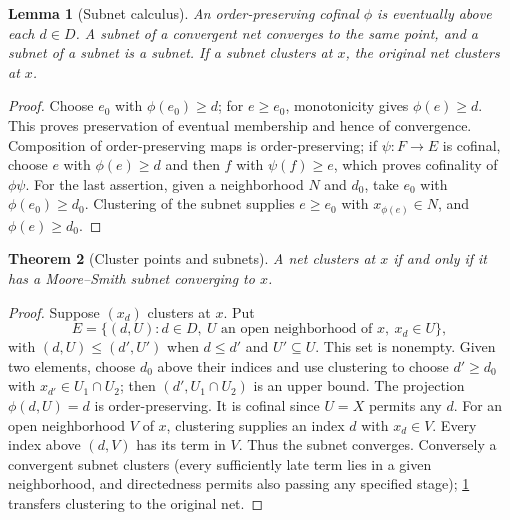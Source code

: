 \documentclass[11pt,oneside,openany]{book}
\newtheorem{theorem}{Theorem}[chapter]
\newtheorem{lemma}[theorem]{Lemma}
\theoremstyle{definition}
\theoremstyle{remark}
\begin{document}
\begin{lemma}[Subnet calculus]\label{d10:04:subnet-calculus}
An order-preserving cofinal $\phi$ is eventually above each $d\in D$. A subnet of a convergent net converges to the same point, and a subnet of a subnet is a subnet. If a subnet clusters at $x$, the original net clusters at $x$.
\end{lemma}
\begin{proof}
Choose $e_0$ with $\phi(e_0)\ge d$; for $e\ge e_0$, monotonicity gives $\phi(e)\ge d$. This proves preservation of eventual membership and hence of convergence. Composition of order-preserving maps is order-preserving; if $\psi:F\to E$ is cofinal, choose $e$ with $\phi(e)\ge d$ and then $f$ with $\psi(f)\ge e$, which proves cofinality of $\phi\psi$. For the last assertion, given a neighborhood $N$ and $d_0$, take $e_0$ with $\phi(e_0)\ge d_0$. Clustering of the subnet supplies $e\ge e_0$ with $x_{\phi(e)}\in N$, and $\phi(e)\ge d_0$.
\end{proof}

\begin{theorem}[Cluster points and subnets]\label{d10:04:cluster-subnet}
A net clusters at $x$ if and only if it has a Moore--Smith subnet converging to $x$.
\end{theorem}
\begin{proof}
Suppose $(x_d)$ clusters at $x$. Put
\[
 E=\{(d,U):d\in D,\ U\text{ an open neighborhood of }x,\ x_d\in U\},
\]
with $(d,U)\le(d',U')$ when $d\le d'$ and $U'\subseteq U$. This set is nonempty. Given two elements, choose $d_0$ above their indices and use clustering to choose $d'\ge d_0$ with $x_{d'}\in U_1\cap U_2$; then $(d',U_1\cap U_2)$ is an upper bound. The projection $\phi(d,U)=d$ is order-preserving. It is cofinal since $U=X$ permits any $d$. For an open neighborhood $V$ of $x$, clustering supplies an index $d$ with $x_d\in V$. Every index above $(d,V)$ has its term in $V$. Thus the subnet converges. Conversely a convergent subnet clusters (every sufficiently late term lies in a given neighborhood, and directedness permits also passing any specified stage); \cref{d10:04:subnet-calculus} transfers clustering to the original net.
\end{proof}
\end{document}

